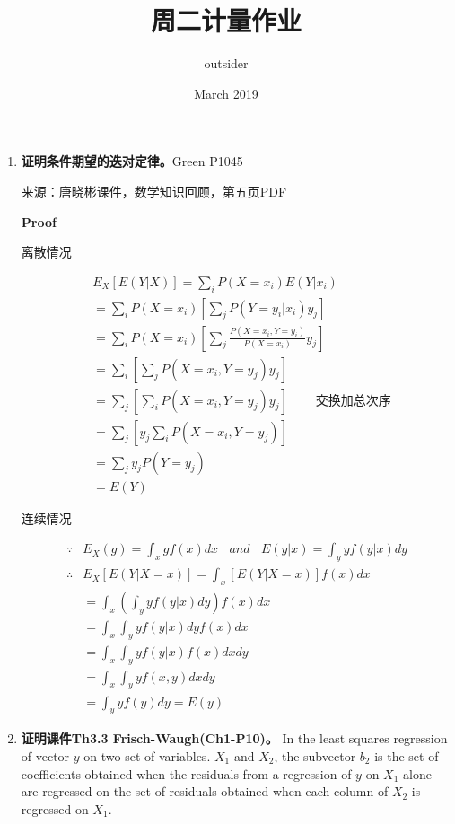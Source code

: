 \documentclass{article}
\title{周二计量作业}
\author{outsider}
\date{March 2019}
\begin{document}
\maketitle

\begin{enumerate}
    \item \textbf{证明条件期望的迭对定律。}Green P1045
    
    来源：唐晓彬课件，数学知识回顾，第五页PDF
    
    \textbf{Proof}
    
    离散情况
    
    $$
      \begin{aligned}
        & E_X[E(Y|X)] = \sum_{i}P(X=x_i)E(Y|x_i) \\
        & = \sum_iP(X=x_i)[\sum_jP(Y=y_i|x_i)y_j] \\
        & = \sum_iP(X=x_i)[\sum_j\frac{P(X=x_i, Y=y_i)}{P(X=x_i)} y_j] \\
        & = \sum_i[\sum_jP(X=x_i, Y=y_j) y_j] \\
        & = \sum_j[\sum_iP(X=x_i, Y=y_j) y_j] \ \ \ \ \ \ \ \ \ \ \text{交换加总次序}\\
        & = \sum_j[y_j \sum_iP(X=x_i, Y=y_j)] \\
        & = \sum_jy_jP(Y=y_j) \\
        & = E(Y)
      \end{aligned}
    $$
    
    连续情况
    
    $$
      \begin{aligned}
        \because & E_X(g) = \int_{x} gf(x)dx\ \ \ \ and \ \ \ \ E(y|x) = \int_yyf(y|x)dy \\
        \therefore & E_X[E(Y|X=x)] = \int_x [E(Y|X=x)]f(x) dx \\
        & = \int_x\left( \int_yyf(y|x)dy \right) f(x)dx \\
        & = \int_x \int_y yf(y|x)dy f(x)dx \\
        & = \int_x \int_y yf(y|x)f(x)dxdy \\
        & = \int_x \int_y yf(x, y)dxdy \\
        & = \int_y yf(y)dy = E(y)
      \end{aligned}
    $$

    \item \textbf{证明课件Th3.3 Frisch-Waugh(Ch1-P10)。} In the least squares regression of vector $y$ on two set of variables. $X_1$ and $X_2$, the subvector $b_2$ is the set of coefficients obtained when the residuals from a regression of $y$ on $X_1$ alone are regressed on the set of residuals obtained when each column of $X_2$ is regressed on $X_1$.
        

\end{enumerate}
\end{document}
